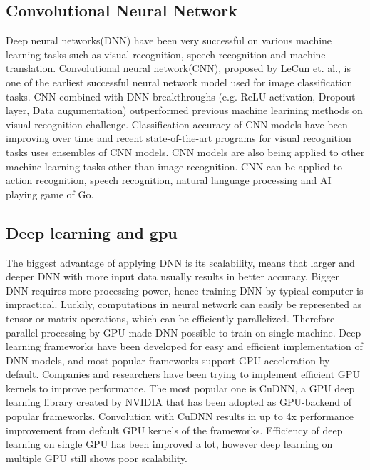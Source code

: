 \documentclass[conference]{IEEEtran}
\begin{document}
\subsection{Convolutional Neural Network}
Deep neural networks(DNN) have been very successful on various machine learning tasks such as visual recognition, speech recognition and machine translation.
\cite{}%
Convolutional neural network(CNN), proposed by LeCun et. al., is one of the earliest successful neural network model used for image classification tasks.
\cite{}%
CNN combined with DNN breakthroughs (e.g. ReLU activation, Dropout layer, Data augumentation) outperformed previous machine learining methods on visual recognition challenge.
\cite{}%
Classification accuracy of CNN models have been improving over time and recent state-of-the-art programs for visual recognition tasks uses ensembles of CNN models.
\cite{}%
CNN models are also being applied to other machine learning tasks other than image recognition. CNN can be applied to action recognition, speech recognition, natural language processing and AI playing game of Go.
\cite{}%

\subsection{Deep learning and gpu}
The biggest advantage of applying DNN is its scalability, means that larger and deeper DNN with more input data usually results in better accuracy.
Bigger DNN requires more processing power, hence training DNN by typical computer is impractical.
Luckily, computations in neural network can easily be represented as tensor or matrix operations, which can be efficiently parallelized.
Therefore parallel processing by GPU made DNN possible to train on single machine.
Deep learning frameworks have been developed for easy and efficient implementation of DNN models, and most popular frameworks support GPU acceleration by default.
\cite{} %
Companies and researchers have been trying to implement efficient GPU kernels to improve performance.
\cite{} %
The most popular one is CuDNN, a GPU deep learning library created by NVIDIA that has been adopted as GPU-backend of popular frameworks.
\cite{} %
Convolution with CuDNN results in up to 4x performance improvement from default GPU kernels of the frameworks.
\cite{} %
Efficiency of deep learning on single GPU has been improved a lot, however deep learning on multiple GPU still shows poor scalability.
\cite{} %
\end{document}
